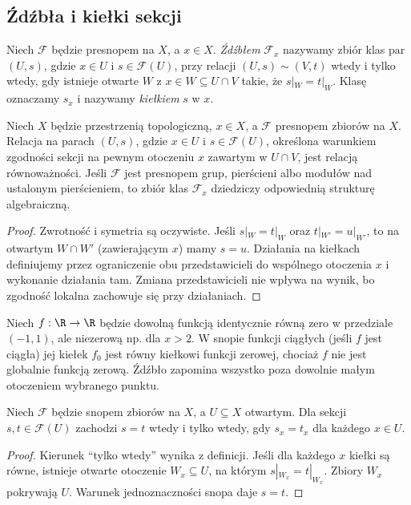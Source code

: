 \subsection{Źdźbła i kiełki sekcji}
\begin{definicja}[Źdźbło]
\label{def:stalk}
Niech $\mathcal F$ będzie presnopem na $X$,
a $x\in X$. \emph{Źdźbłem} $\mathcal F_x$
nazywamy zbiór klas par $(U,s)$, gdzie $x\in U$
i $s\in\mathcal F(U)$, przy relacji
$(U,s)\sim(V,t)$ wtedy i tylko wtedy, gdy istnieje
otwarte $W$ z $x\in W\subseteq U\cap V$
takie, że $s|_W=t|_W$. Klasę oznaczamy $s_x$
i nazywamy \emph{kiełkiem} $s$ w $x$.
\end{definicja}

\begin{stwierdzenie}
Niech $X$ będzie przestrzenią topologiczną, $x\in X$,
a $\mathcal F$ presnopem zbiorów na $X$. Relacja na
parach $(U,s)$, gdzie $x\in U$ i $s\in\mathcal F(U)$,
określona warunkiem zgodności sekcji na pewnym otoczeniu
$x$ zawartym w $U\cap V$, jest relacją równoważności.
Jeśli $\mathcal F$ jest presnopem grup, pierścieni albo
modułów nad ustalonym pierścieniem, to zbiór klas
$\mathcal F_x$ dziedziczy odpowiednią strukturę algebraiczną.
\end{stwierdzenie}
\begin{proof}
Zwrotność i symetria są oczywiste. Jeśli
$s|_W=t|_W$ oraz $t|_{W'}=u|_{W'}$, to
na otwartym $W\cap W'$ (zawierającym $x$)
mamy $s=u$. Działania na kiełkach definiujemy
przez ograniczenie obu przedstawicieli do
wspólnego otoczenia $x$ i wykonanie działania tam.
Zmiana przedstawicieli nie wpływa na wynik,
bo zgodność lokalna zachowuje się przy działaniach.
\end{proof}

\begin{przyklad}
Niech $f:\R\to\R$ będzie dowolną funkcją
identycznie równą zero w przedziale $(-1,1)$,
ale niezerową np. dla $x>2$. W snopie funkcji
ciągłych (jeśli $f$ jest ciągła) jej kiełek
$f_0$ jest równy kiełkowi funkcji zerowej,
chociaż $f$ nie jest globalnie funkcją zerową.
Źdźbło zapomina wszystko poza dowolnie małym
otoczeniem wybranego punktu.
\end{przyklad}

\begin{twierdzenie}
\label{tw:germ-zero}
Niech $\mathcal F$ będzie snopem zbiorów na $X$,
a $U\subseteq X$ otwartym. Dla sekcji
$s,t\in\mathcal F(U)$ zachodzi $s=t$ wtedy
i tylko wtedy, gdy $s_x=t_x$ dla każdego $x\in U$.
\end{twierdzenie}
\begin{proof}
Kierunek ``tylko wtedy'' wynika z definicji.
Jeśli dla każdego $x$ kiełki są równe,
istnieje otwarte otoczenie $W_x\subseteq U$, na
którym $s|_{W_x}=t|_{W_x}$. Zbiory $W_x$ pokrywają $U$.
Warunek jednoznaczności snopa daje $s=t$.
\end{proof}

